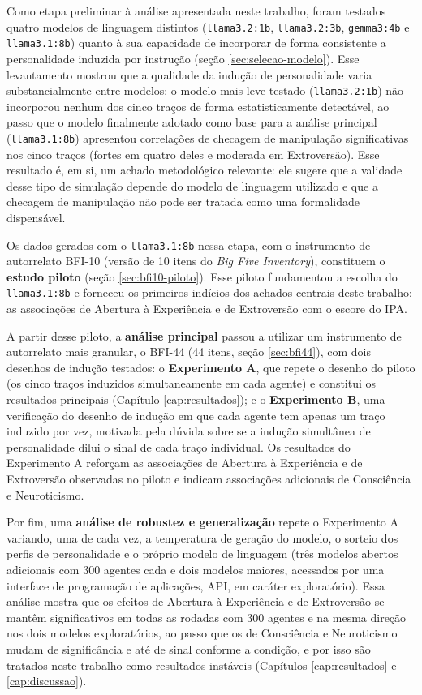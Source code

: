Como etapa preliminar à análise apresentada neste trabalho, foram testados
quatro modelos de linguagem distintos (\texttt{llama3.2:1b},
\texttt{llama3.2:3b}, \texttt{gemma3:4b} e \texttt{llama3.1:8b}) quanto à
sua capacidade de incorporar de forma consistente a personalidade induzida
por instrução (seção \ref{sec:selecao-modelo}). Esse levantamento mostrou
que a qualidade da indução de personalidade varia substancialmente entre
modelos: o modelo mais leve testado (\texttt{llama3.2:1b}) não incorporou
nenhum dos cinco traços de forma estatisticamente detectável, ao passo que
o modelo finalmente adotado como base para a análise principal
(\texttt{llama3.1:8b}) apresentou correlações de checagem de manipulação
significativas nos cinco traços (fortes em quatro deles e moderada em
Extroversão). Esse resultado é, em si, um
achado metodológico relevante: ele sugere que a validade desse tipo de
simulação depende do modelo de linguagem utilizado e que a checagem de
manipulação não pode ser tratada como uma formalidade dispensável.

Os dados gerados com o \texttt{llama3.1:8b} nessa etapa, com o
instrumento de autorrelato BFI-10 (versão de 10 itens do \textit{Big Five
Inventory}), constituem o \textbf{estudo piloto} (seção
\ref{sec:bfi10-piloto}). Esse piloto fundamentou a escolha do
\texttt{llama3.1:8b} e forneceu os primeiros indícios dos achados
centrais deste trabalho: as associações de Abertura à Experiência e de
Extroversão com o escore do IPA.

A partir desse piloto, a \textbf{análise principal} passou a utilizar um
instrumento de autorrelato mais granular, o BFI-44 (44 itens, seção
\ref{sec:bfi44}), com dois desenhos de indução testados: o
\textbf{Experimento A}, que repete o desenho do piloto (os cinco traços
induzidos simultaneamente em cada agente) e constitui os resultados
principais (Capítulo \ref{cap:resultados}); e o \textbf{Experimento B},
uma verificação do desenho de indução em que cada agente tem apenas um
traço induzido por vez, motivada pela dúvida sobre se a indução
simultânea de personalidade dilui o sinal de cada traço individual. Os
resultados do Experimento A reforçam as associações de Abertura à
Experiência e de Extroversão observadas no piloto e indicam associações
adicionais de Consciência e Neuroticismo.

Por fim, uma \textbf{análise de robustez e generalização} repete o
Experimento A variando, uma de cada vez, a temperatura de geração do
modelo, o sorteio dos perfis de personalidade e o próprio modelo de
linguagem (três modelos abertos adicionais com 300 agentes cada e dois
modelos maiores, acessados por uma interface de programação de
aplicações, API, em caráter exploratório). Essa análise mostra que os
efeitos de Abertura à Experiência e de Extroversão se mantêm
significativos em todas as rodadas com 300 agentes e na mesma direção
nos dois modelos exploratórios, ao passo que os de Consciência e
Neuroticismo mudam de significância e até de sinal conforme a condição,
e por isso são tratados neste trabalho como resultados
instáveis (Capítulos \ref{cap:resultados} e \ref{cap:discussao}).

